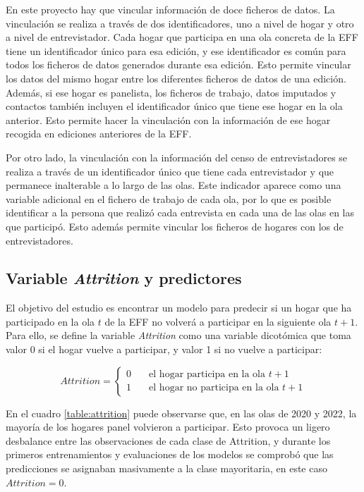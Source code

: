 En este proyecto hay que vincular información de doce ficheros de datos. La vinculación se realiza a través de dos identificadores, uno a nivel de hogar y otro a nivel de entrevistador. Cada hogar que participa en una ola concreta de la EFF tiene un identificador único para esa edición, y ese identificador es común para todos los ficheros de datos generados durante esa edición. Esto permite vincular los datos del mismo hogar entre los diferentes ficheros de datos de una edición. Además, si ese hogar es panelista, los ficheros de trabajo, datos imputados y contactos también incluyen el identificador único que tiene ese hogar en la ola anterior. Esto permite hacer la vinculación con la información de ese hogar recogida en ediciones anteriores de la EFF.

Por otro lado, la vinculación con la información del censo de entrevistadores se realiza a través de un identificador único que tiene cada entrevistador y que permanece inalterable a lo largo de las olas. Este indicador aparece como una variable adicional en el fichero de trabajo de cada ola, por lo que es posible identificar a la persona que realizó cada entrevista en cada una de las olas en las que participó. Esto además permite vincular los ficheros de hogares con los de entrevistadores.

\subsection*{Variable \textit{Attrition} y predictores}

El objetivo del estudio es encontrar un modelo para predecir si un hogar que ha participado en la ola $t$ de la EFF no volverá a participar en la siguiente ola $t+1$. Para ello, se define la variable \textit{Attrition} como una variable dicotómica que toma valor 0 si el hogar vuelve a participar, y valor 1 si no vuelve a participar:

\begin{equation}
Attrition =
  \begin{cases}
    0       & \quad \text{el hogar participa en la ola $t+1$} \\
    1  & \quad \text{el hogar no participa en la ola $t+1$}
  \end{cases}
\end{equation}

En el cuadro \ref{table:attrition} puede observarse que, en las olas de 2020 y 2022, la mayoría de los hogares panel volvieron a participar. Esto provoca un ligero desbalance entre las observaciones de cada clase de Attrition, y durante los primeros entrenamientos y evaluaciones de los modelos se comprobó que las predicciones se asignaban masivamente a la clase mayoritaria, en este caso $Attrition=0$.

